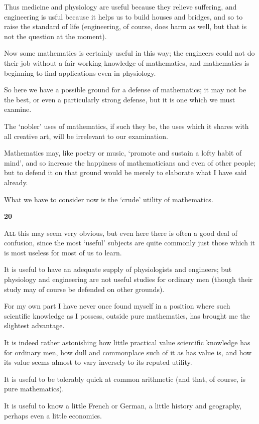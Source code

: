 \documentclass{article}
\numberwithin{equation}{section}
\begin{document}
Thus medicine and physiology are useful because they relieve suffering, and engineering is usful because it helps us to build houses and bridges, and so to raise the standard of life (engineering, of course, does harm as well, but that is not the question at the moment).

Now some mathematics is certainly useful in this way; the engineers could not do their job without a fair working knowledge of mathematics, and mathematics is beginning to find applications even in physiology.

So here we have a possible ground for a defense of mathematics; it may not be the best, or even a particularly strong defense, but it is one which we must examine.

The `nobler' uses of mathematics, if such they be, the uses which it shares with all creative art, will be irrelevant to our examination.

Mathematics may, like poetry or music, `promote and sustain a lofty habit of mind', and so increase the happiness of mathematicians and even of other people; but to defend it on that ground would be merely to elaborate what I have said already.

What we have to consider now is the `crude' utility of mathematics.

\begin{center}
    \large\textbf{20}
\end{center}
\textsc{All} this may seem very obvious, but even here there is often a good deal of confusion, since the most `useful' subjects are quite commonly just those which it is most useless for most of us to learn.

It is useful to have an adequate supply of physiologists and engineers; but physiology and engineering are not useful studies for ordinary men (though their study may of course be defended on other grounds).

For my own part I have never once found myself in a position where such scientific knowledge as I possess, outside pure mathematics, has brought me the slightest advantage.

%
It is indeed rather astonishing how little practical value scientific knowledge has for ordinary men, how dull and commonplace such of it as has value is, and how its value seems almost to vary inversely to its reputed utility.

It is useful to be tolerably quick at common arithmetic (and that, of course, is pure mathematics).

It is useful to know a little French or German, a little history and geography, perhaps even a little economics.
\end{document}
